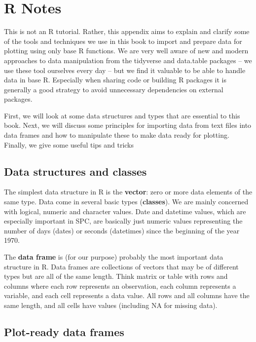 \documentclass[
]{book}
\begin{document}
\chapter{R Notes}\label{r-notes}

This is not an R tutorial. Rather, this appendix aims to explain and clarify some of the tools and techniques we use in this book to import and prepare data for plotting using only base R functions. We are very well aware of new and modern approaches to data manipulation from the tidyverse and data.table packages -- we use these tool ourselves every day -- but we find it valuable to be able to handle data in base R. Especially when sharing code or building R packages it is generally a good strategy to avoid unnecessary dependencies on external packages.

First, we will look at some data structures and types that are essential to this book. Next, we will discuss some principles for importing data from text files into data frames and how to manipulate these to make data ready for plotting. Finally, we give some useful tips and tricks

\section{Data structures and classes}\label{data-structures-and-classes}

The simplest data structure in R is the \textbf{vector}: zero or more data elements of the same type. Data come in several basic types (\textbf{classes}). We are mainly concerned with logical, numeric and character values. Date and datetime values, which are especially important in SPC, are basically just numeric values representing the number of days (dates) or seconds (datetimes) since the beginning of the year 1970.

The \textbf{data frame} is (for our purpose) probably the most important data structure in R. Data frames are collections of vectors that may be of different types but are all of the same length. Think matrix or table with rows and columns where each row represents an observation, each column represents a variable, and each cell represents a data value. All rows and all columns have the same length, and all cells have values (including NA for missing data).

\section{Plot-ready data frames}\label{plot-ready-data-frames}
\end{document}
